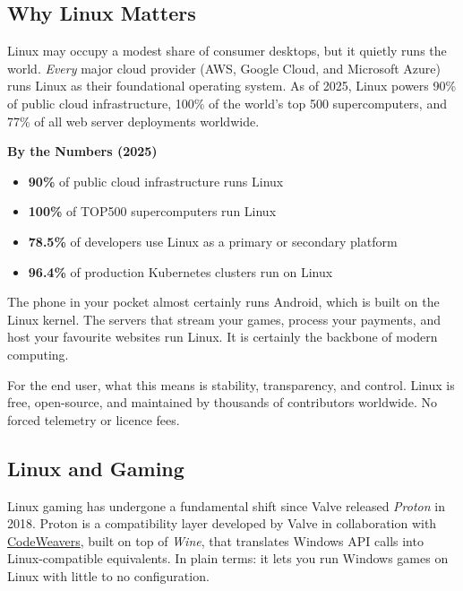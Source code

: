 \documentclass{article}
\begin{document}
\subsection{Why Linux Matters}

Linux may occupy a modest share of consumer desktops, but it quietly runs the world. \textit{Every} major cloud provider (AWS, Google Cloud, and Microsoft Azure) runs
Linux as their foundational operating system. As of 2025, Linux powers 90\% of public cloud infrastructure, 100\% of the world's top 500 supercomputers, and 77\% of all web server deployments worldwide.

\begin{callout}{\textbf{By the Numbers (2025)}}
  \begin{itemize}[nosep, leftmargin=1.2em, label={\tiny\textbullet}]
    \item \textbf{90\%} of public cloud infrastructure runs Linux
    \item \textbf{100\%} of TOP500 supercomputers run Linux
    \item \textbf{78.5\%} of developers use Linux as a primary or secondary platform
    \item \textbf{96.4\%} of production Kubernetes clusters run on Linux
  \end{itemize}
\end{callout}

\noindent The phone in your pocket almost certainly runs Android, which is built on the Linux kernel. The servers that stream your games, process your payments, and host
your favourite websites run Linux. It is certainly the backbone of modern computing.

For the end user, what this means is stability, transparency, and control. Linux is free, open-source, and maintained by thousands of contributors worldwide. No forced telemetry or licence fees.

\subsection{Linux and Gaming}

Linux gaming has undergone a fundamental shift since Valve released \textit{Proton} in 2018. Proton is a compatibility layer developed by Valve in collaboration with \href{https://www.codeweavers.com}{CodeWeavers}, built on top of \textit{Wine}, that translates Windows API calls into Linux-compatible equivalents. In plain terms: it lets you run Windows games on Linux with little to no configuration.
\end{document}
